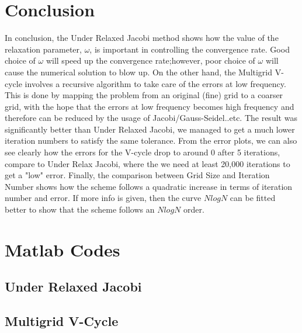 \documentclass{article}
\begin{document}
\section{Conclusion}
In conclusion, the Under Relaxed Jacobi method shows how the value of the relaxation parameter, $\omega$, is important in controlling the convergence rate. Good choice of $\omega$ will speed up the convergence rate;however, poor choice of $\omega$ will cause the numerical solution to blow up. On the other hand, the Multigrid V-cycle involves a recursive algorithm to take care of the errors at low frequency. This is done by mapping the problem from an original (fine) grid to a coarser grid, with the hope that the errors at low frequency becomes high frequency and therefore can be reduced by the usage of Jacobi/Gauss-Seidel..etc. The result was significantly better than Under Relaxed Jacobi, we managed to get a much lower iteration numbers to satisfy the same tolerance.  From the error plots, we can also see clearly how the errors for the V-cycle drop to around 0 after 5 iterations, compare to Under Relax Jacobi, where the we need at least 20,000 iterations to get a "low" error.  Finally, the comparison between Grid Size and Iteration Number shows how the scheme follows a quadratic increase in terms of iteration number and error.  If more info is given, then the curve $NlogN$ can be fitted better to show that the scheme follows an $NlogN$ order. 

\newpage
\section{Matlab Codes}
\subsection{Under Relaxed Jacobi}

\newpage
\subsection{Multigrid V-Cycle}

\end{document}
